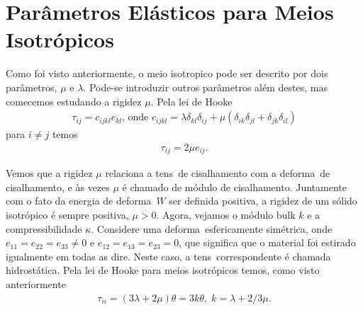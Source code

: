 



%

%

\section{Par\^ametros El\'asticos para Meios Isotr\'opicos}

Como foi visto anteriormente, o meio isotropico pode ser descrito por
dois par\^ametros, $\mu$ e $\lambda$. Pode-se introduzir outros
par\^ametros al\'em destes, mas comecemos estudando a rigidez $\mu$.
Pela lei de Hooke
\begin{eqnarray}
\tau_{ij} =
c_{ijkl}e_{kl} \mbox{, onde } c_{ijkl} = \lambda\delta_{kl}\delta_{ij} 
+ \mu(\delta_{ik}\delta_{jl} + \delta_{jk}\delta_{il})
\end{eqnarray}
para $i \neq j$ temos
\begin{eqnarray}
\tau_{ij} = 2\mu e_{ij}.
\end{eqnarray}

Vemos que a rigidez $\mu$ relaciona a tens\ao\ de cisalhamento com a
deforma\cao\ de cisalhamento, e \`as vezes $\mu$ \'e chamado de m\'odulo
de cisalhamento. Juntamente com o fato da energia de deforma\cao\ $W$
ser definida positiva, a rigidez de um s\'olido isotr\'opico \'e sempre
positiva, $\mu > 0$. Agora, vejamos o m\'odulo bulk $k$ e a
compressibilidade $\kappa$. Considere uma deforma\cao\ esfericamente
sim\'etrica, onde $e_{11}=e_{22}=e_{33} \neq 0$ e
$e_{12}=e_{13}=e_{23}=0$, que significa que o material foi estirado
igualmente em todas as dire\coes. Neste caso, a tens\ao\ correspondente
\'e chamada hidrost\'atica. Pela lei de Hooke para meios isotr\'opicos
temos, como visto anteriormente
\begin{eqnarray}
\tau_{ii} = (3\lambda+2\mu)\theta = 3k\theta, \; k = \lambda + 2/3\mu.
\end{eqnarray}

